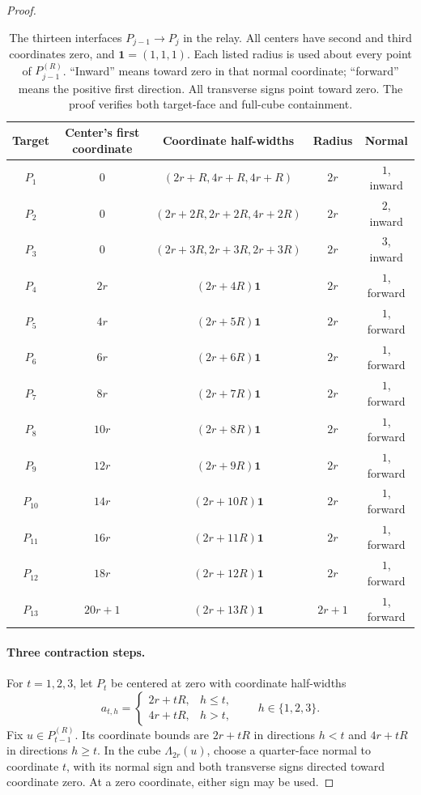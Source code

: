 \documentclass[11pt]{article}
\theoremstyle{definition}
\theoremstyle{remark}
\numberwithin{equation}{section}
\begin{document}
\begin{proof}
\begin{table}[tbp]
\small
\begin{tabular}{c c c c c}
\hline
Target & Center's first coordinate & Coordinate half-widths & Radius & Normal\\
\hline
$P_1$ & $0$ & $(2r+R,4r+R,4r+R)$ & $2r$ & $1$, inward\\
$P_2$ & $0$ & $(2r+2R,2r+2R,4r+2R)$ & $2r$ & $2$, inward\\
$P_3$ & $0$ & $(2r+3R,2r+3R,2r+3R)$ & $2r$ & $3$, inward\\
$P_4$ & $2r$ & $(2r+4R)\mathbf1$ & $2r$ & $1$, forward\\
$P_5$ & $4r$ & $(2r+5R)\mathbf1$ & $2r$ & $1$, forward\\
$P_6$ & $6r$ & $(2r+6R)\mathbf1$ & $2r$ & $1$, forward\\
$P_7$ & $8r$ & $(2r+7R)\mathbf1$ & $2r$ & $1$, forward\\
$P_8$ & $10r$ & $(2r+8R)\mathbf1$ & $2r$ & $1$, forward\\
$P_9$ & $12r$ & $(2r+9R)\mathbf1$ & $2r$ & $1$, forward\\
$P_{10}$ & $14r$ & $(2r+10R)\mathbf1$ & $2r$ & $1$, forward\\
$P_{11}$ & $16r$ & $(2r+11R)\mathbf1$ & $2r$ & $1$, forward\\
$P_{12}$ & $18r$ & $(2r+12R)\mathbf1$ & $2r$ & $1$, forward\\
$P_{13}$ & $20r+1$ & $(2r+13R)\mathbf1$ & $2r+1$ & $1$, forward\\
\hline
\end{tabular}
\caption{The thirteen interfaces $P_{j-1}\to P_j$ in the relay.
All centers have second and third coordinates zero, and
$\mathbf1=(1,1,1)$. Each listed radius is used about every point
of $P_{j-1}^{(R)}$. ``Inward'' means toward zero in that normal coordinate;
``forward'' means the positive first direction. All transverse signs point
toward zero. The proof verifies both target-face and full-cube containment.}
\label{geom:interfaces}
\end{table}

\paragraph{Three contraction steps.}
For $t=1,2,3$, let $P_t$ be centered at zero with coordinate half-widths
\begin{equation}\label{geom:contraction-widths}
  a_{t,h}=\begin{cases}
    2r+tR,&h\le t,\\
    4r+tR,&h>t,
  \end{cases}
  \qquad h\in\{1,2,3\}.
\end{equation}
Fix $u\in P_{t-1}^{(R)}$. Its coordinate bounds are $2r+tR$ in directions
$h<t$ and $4r+tR$ in directions $h\ge t$. In the cube $\Lambda_{2r}(u)$,
choose a quarter-face normal to coordinate $t$, with its normal sign and both
transverse signs directed toward coordinate zero. At a zero coordinate,
either sign may be used.


\end{proof}
\end{document}
